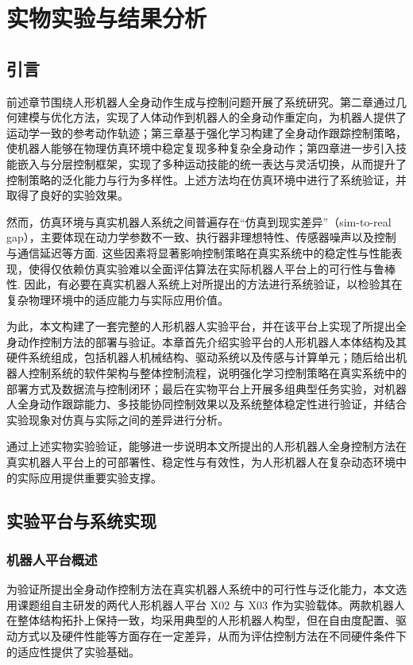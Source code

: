 \chapter{实物实验与结果分析}
\section{引言}
 前述章节围绕人形机器人全身动作生成与控制问题开展了系统研究。第二章通过几何建模与优化方法，实现了人体动作到机器人的全身动作重定向，为机器人提供了运动学一致的参考动作轨迹；第三章基于强化学习构建了全身动作跟踪控制策略，使机器人能够在物理仿真环境中稳定复现多种复杂全身动作；第四章进一步引入技能嵌入与分层控制框架，实现了多种运动技能的统一表达与灵活切换，从而提升了控制策略的泛化能力与行为多样性。上述方法均在仿真环境中进行了系统验证，并取得了良好的实验效果。
 
然而，仿真环境与真实机器人系统之间普遍存在“仿真到现实差异”（sim-to-real gap），主要体现在动力学参数不一致、执行器非理想特性、传感器噪声以及控制与通信延迟等方面\cite{tobin2017domain,peng2018sim,antonova2017deep}. 这些因素将显著影响控制策略在真实系统中的稳定性与性能表现，使得仅依赖仿真实验难以全面评估算法在实际机器人平台上的可行性与鲁棒性\cite{jakobi1995noise,hoffer2017train}. 因此，有必要在真实机器人系统上对所提出的方法进行系统验证，以检验其在复杂物理环境中的适应能力与实际应用价值。

 
 为此，本文构建了一套完整的人形机器人实验平台，并在该平台上实现了所提出全身动作控制方法的部署与验证。本章首先介绍实验平台的人形机器人本体结构及其硬件系统组成，包括机器人机械结构、驱动系统以及传感与计算单元；随后给出机器人控制系统的软件架构与整体控制流程，说明强化学习控制策略在真实系统中的部署方式及数据流与控制闭环；最后在实物平台上开展多组典型任务实验，对机器人全身动作跟踪能力、多技能协同控制效果以及系统整体稳定性进行验证，并结合实验现象对仿真与实际之间的差异进行分析。
 
 通过上述实物实验验证，能够进一步说明本文所提出的人形机器人全身控制方法在真实机器人平台上的可部署性、稳定性与有效性，为人形机器人在复杂动态环境中的实际应用提供重要实验支撑。
 
 \section{实验平台与系统实现}
\subsection{机器人平台概述}

为验证所提出全身动作控制方法在真实机器人系统中的可行性与泛化能力，本文选用课题组自主研发的两代人形机器人平台 X02 与 X03 作为实验载体。两款机器人在整体结构拓扑上保持一致，均采用典型的人形机器人构型，但在自由度配置、驱动方式以及硬件性能等方面存在一定差异，从而为评估控制方法在不同硬件条件下的适应性提供了实验基础。

